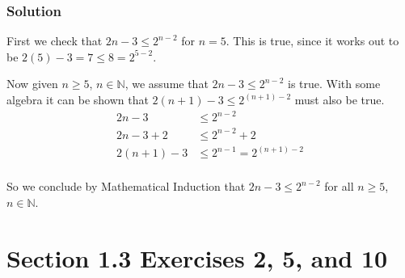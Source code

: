 \documentclass[12pt]{article}
\begin{document}
\subsubsection*{Solution}
First we check that $2n - 3 \leq 2^{n-2}$ for $n = 5$. This is true, since it works out to be $2(5) - 3 = 7 \leq 8 = 2^{5 - 2}$.

Now given $n \geq 5$, $n \in \mathbb{N}$, we assume that $2n - 3 \leq 2^{n-2}$ is true. With some algebra it can be shown that $2\left(n + 1\right) - 3 \leq 2^{\left(n + 1\right) - 2}$ must also be true.
\begin{align*}
2n - 3 &\leq 2^{n - 2} \\
2n - 3 + 2 &\leq 2^{n - 2} + 2 \\
2\left(n + 1\right) - 3 &\leq 2^{n - 1} = 2^{\left(n + 1\right) - 2} \\
\end{align*}

So we conclude by Mathematical Induction that $2n - 3 \leq 2^{n-2}$ for all $n \geq 5$, $n \in \mathbb{N}$.

\section*{Section 1.3 Exercises 2, 5, and 10}
\end{document}
